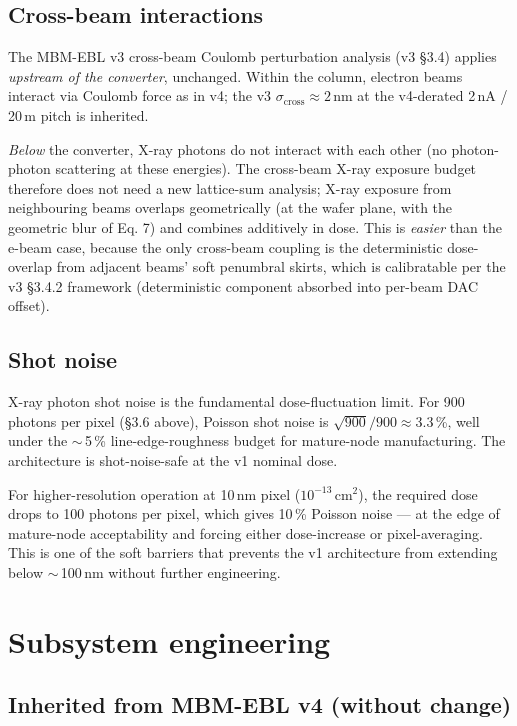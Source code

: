 \documentclass[11pt,letterpaper]{article}
\begin{document}
\subsection{Cross-beam interactions}

The MBM-EBL v3 cross-beam Coulomb perturbation analysis (v3 \S 3.4) applies \textit{upstream of the converter}, unchanged. Within the column, electron beams interact via Coulomb force as in v4; the v3 $\sigma_\text{cross} \approx 2$\,nm at the v4-derated 2\,nA / 20\,\textmu m pitch is inherited.

\textit{Below} the converter, X-ray photons do not interact with each other (no photon-photon scattering at these energies). The cross-beam X-ray exposure budget therefore does not need a new lattice-sum analysis; X-ray exposure from neighbouring beams overlaps geometrically (at the wafer plane, with the geometric blur of Eq. 7) and combines additively in dose. This is \textit{easier} than the e-beam case, because the only cross-beam coupling is the deterministic dose-overlap from adjacent beams' soft penumbral skirts, which is calibratable per the v3 \S 3.4.2 framework (deterministic component absorbed into per-beam DAC offset).

\subsection{Shot noise}

X-ray photon shot noise is the fundamental dose-fluctuation limit. For 900 photons per pixel (\S 3.6 above), Poisson shot noise is $\sqrt{900}/900 \approx 3.3$\,\%, well under the $\sim$\,5\,\% line-edge-roughness budget for mature-node manufacturing. The architecture is shot-noise-safe at the v1 nominal dose.

For higher-resolution operation at 10\,nm pixel ($10^{-13}$\,cm$^2$), the required dose drops to 100 photons per pixel, which gives 10\,\% Poisson noise --- at the edge of mature-node acceptability and forcing either dose-increase or pixel-averaging. This is one of the soft barriers that prevents the v1 architecture from extending below $\sim$\,100\,nm without further engineering.

\section{Subsystem engineering}

\subsection{Inherited from MBM-EBL v4 (without change)}
\end{document}
